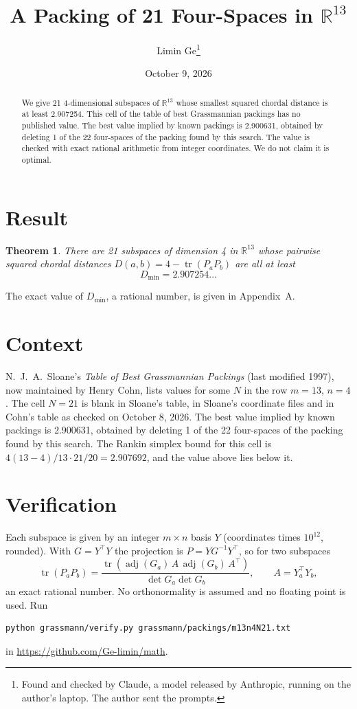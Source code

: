 \documentclass[11pt,a4paper]{article}
\title{A Packing of 21 Four-Spaces in $\mathbb{R}^{13}$}
\author{Limin Ge\thanks{Found and checked by Claude, a model released by Anthropic, running on the author's laptop. The author sent the prompts.}}
\date{October 9, 2026}
\newtheorem*{theorem}{Theorem}
\begin{document}
\maketitle
\begin{abstract}
We give 21 4-dimensional subspaces of $\mathbb{R}^{13}$ whose smallest squared chordal distance is at least 2.907254. This cell of the table of best Grassmannian packings has no published value. The best value implied by known packings is 2.900631, obtained by deleting 1 of the 22 four-spaces of the packing found by this search. The value is checked with exact rational arithmetic from integer coordinates. We do not claim it is optimal.
\end{abstract}

\section{Result}
\begin{theorem}
There are 21 subspaces of dimension 4 in $\mathbb{R}^{13}$ whose pairwise squared chordal distances $D(a,b) = 4 - \operatorname{tr}(P_aP_b)$ are all at least
\[ D_{\min} = 2.907254\ldots \]
\end{theorem}
The exact value of $D_{\min}$, a rational number, is given in Appendix~A.


\section{Context}
N.~J.~A.~Sloane's \emph{Table of Best Grassmannian Packings} (last modified 1997), now maintained by Henry Cohn, lists values for some $N$ in the row $m=13$, $n=4$. The cell $N=21$ is blank in Sloane's table, in Sloane's coordinate files and in Cohn's table as checked on October 8, 2026. The best value implied by known packings is 2.900631, obtained by deleting 1 of the 22 four-spaces of the packing found by this search. The Rankin simplex bound for this cell is $4(13-4)/13\cdot 21/20 = 2.907692$, and the value above lies below it.


\section{Verification}
Each subspace is given by an integer $m\times n$ basis $Y$ (coordinates times $10^{12}$, rounded). With $G=Y^\top Y$ the projection is $P=YG^{-1}Y^\top$, so for two subspaces
\[ \operatorname{tr}(P_aP_b)=\frac{\operatorname{tr}(\operatorname{adj}(G_a)\,A\,\operatorname{adj}(G_b)\,A^\top)}{\det G_a\det G_b},\qquad A=Y_a^\top Y_b, \]
an exact rational number. No orthonormality is assumed and no floating point is used. Run
\begin{verbatim}
python grassmann/verify.py grassmann/packings/m13n4N21.txt
\end{verbatim}
in \url{https://github.com/Ge-limin/math}.
\end{document}
